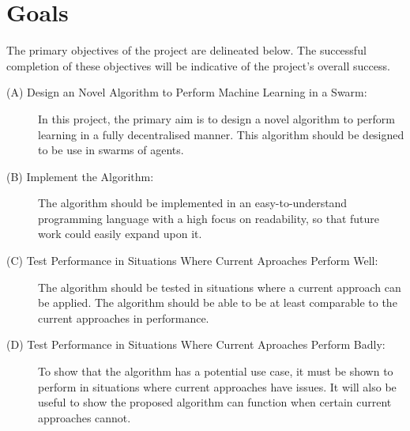 \section{Goals} \label{goals}
The primary objectives of the project are delineated below. The successful completion of these objectives will be indicative of the project's overall success.
\begin{description}
	\item[(A) Design an Novel Algorithm to Perform Machine Learning in a Swarm:] In this project, the primary aim is to design a novel algorithm to perform learning in a fully decentralised manner. This algorithm should be designed to be use in swarms of agents.
	\item[(B) Implement the Algorithm:] The algorithm should be implemented in an easy-to-understand programming language with a high focus on readability, so that future work could easily expand upon it.
	\item[(C) Test Performance in Situations Where Current Aproaches Perform Well:] The algorithm should be tested in situations where a current approach can be applied. The algorithm should be able to be at least comparable to the current approaches in performance.
	\item[(D) Test Performance in Situations Where Current Aproaches Perform Badly:] To show that the algorithm has a potential use case, it must be shown to perform in situations where current approaches have issues. It will also be useful to show the proposed algorithm can function when certain current approaches cannot.
\end{description}